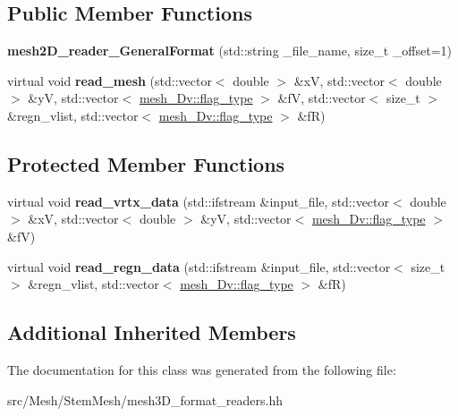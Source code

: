 \subsection*{Public Member Functions}
\begin{DoxyCompactItemize}
\item 
\mbox{\label{classStemMesh3D_1_1mesh2D__reader__GeneralFormat_a773b0b9beba365bfc540c4050154bf2e}} 
{\bfseries mesh2\+D\+\_\+reader\+\_\+\+General\+Format} (std\+::string \+\_\+file\+\_\+name, size\+\_\+t \+\_\+offset=1)
\item 
\mbox{\label{classStemMesh3D_1_1mesh2D__reader__GeneralFormat_a37ab61a2a4e9aababdee54e91aca81be}} 
virtual void {\bfseries read\+\_\+mesh} (std\+::vector$<$ double $>$ \&xV, std\+::vector$<$ double $>$ \&yV, std\+::vector$<$ \hyperlink{classStemMesh3D_1_1mesh__3Dv_a9544cba555b60f17f04fcd1689314338}{mesh\+\_\+Dv\+::flag\+\_\+type} $>$ \&fV, std\+::vector$<$ size\+\_\+t $>$ \&regn\+\_\+vlist, std\+::vector$<$ \hyperlink{classStemMesh3D_1_1mesh__3Dv_a9544cba555b60f17f04fcd1689314338}{mesh\+\_\+Dv\+::flag\+\_\+type} $>$ \&fR)
\end{DoxyCompactItemize}
\subsection*{Protected Member Functions}
\begin{DoxyCompactItemize}
\item 
\mbox{\label{classStemMesh3D_1_1mesh2D__reader__GeneralFormat_a4a4ae19f3aa529054c00d345171e9146}} 
virtual void {\bfseries read\+\_\+vrtx\+\_\+data} (std\+::ifstream \&input\+\_\+file, std\+::vector$<$ double $>$ \&xV, std\+::vector$<$ double $>$ \&yV, std\+::vector$<$ \hyperlink{classStemMesh3D_1_1mesh__3Dv_a9544cba555b60f17f04fcd1689314338}{mesh\+\_\+Dv\+::flag\+\_\+type} $>$ \&fV)
\item 
\mbox{\label{classStemMesh3D_1_1mesh2D__reader__GeneralFormat_a3fdc49ff130caa2aa233f4364dcf44a0}} 
virtual void {\bfseries read\+\_\+regn\+\_\+data} (std\+::ifstream \&input\+\_\+file, std\+::vector$<$ size\+\_\+t $>$ \&regn\+\_\+vlist, std\+::vector$<$ \hyperlink{classStemMesh3D_1_1mesh__3Dv_a9544cba555b60f17f04fcd1689314338}{mesh\+\_\+Dv\+::flag\+\_\+type} $>$ \&fR)
\end{DoxyCompactItemize}
\subsection*{Additional Inherited Members}


The documentation for this class was generated from the following file\+:\begin{DoxyCompactItemize}
\item 
src/\+Mesh/\+Stem\+Mesh/mesh3\+D\+\_\+format\+\_\+readers.\+hh\end{DoxyCompactItemize}
